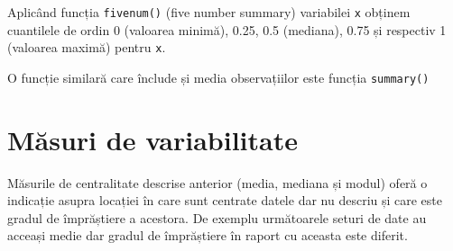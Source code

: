 \documentclass[]{article}
\newenvironment{Shaded}{\begin{snugshade}}{\end{snugshade}}
\newcommand{\KeywordTok}[1]{\textcolor[rgb]{0.13,0.29,0.53}{\textbf{#1}}}
\newcommand{\DecValTok}[1]{\textcolor[rgb]{0.00,0.00,0.81}{#1}}
\newcommand{\FloatTok}[1]{\textcolor[rgb]{0.00,0.00,0.81}{#1}}
\newcommand{\OperatorTok}[1]{\textcolor[rgb]{0.81,0.36,0.00}{\textbf{#1}}}
\newcommand{\NormalTok}[1]{#1}
\begin{document}
Aplicând funcția \texttt{fivenum()} (five number summary) variabilei
\texttt{x} obținem cuantilele de ordin 0 (valoarea minimă), 0.25, 0.5
(mediana), 0.75 și respectiv 1 (valoarea maximă) pentru \texttt{x}.

\begin{Shaded}
\end{Shaded}

O funcție similară care înclude și media observațiilor este funcția
\texttt{summary()}

\begin{Shaded}
\end{Shaded}

\section{Măsuri de variabilitate}\label{masuri-de-variabilitate}

Măsurile de centralitate descrise anterior (media, mediana și modul)
oferă o indicație asupra locației în care sunt centrate datele dar nu
descriu și care este gradul de împrăștiere a acestora. De exemplu
următoarele seturi de date au acceași medie dar gradul de împrăștiere în
raport cu aceasta este diferit.
\end{document}
